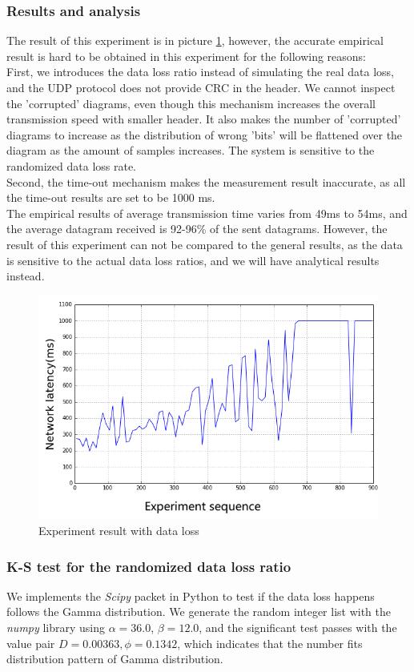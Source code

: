 \documentclass[11pt,openright,a4paper]{report}
\begin{document}
\subsubsection{Results and analysis}
The result of this experiment is in picture \ref{fig:dataLoss}, however, the accurate empirical result is hard to be obtained in this experiment for the following reasons:\\
First, we introduces the data loss ratio instead of simulating the real data loss, and the UDP protocol does not provide CRC in the header. We cannot inspect the 'corrupted' diagrams, even though this mechanism increases the overall transmission speed with smaller header. It also makes the number of 'corrupted' diagrams to increase as the distribution of wrong 'bits' will be flattened over the diagram as the amount of samples increases. The system is sensitive to the randomized data loss rate.\\
Second, the time-out mechanism makes the measurement result inaccurate, as all the time-out results are set to be 1000 ms.\\
The empirical results of average transmission time varies from 49ms to 54ms, and the average datagram received is 92-96\% of the sent datagrams. However, the result of this experiment can not be compared to the general results, as the data is sensitive to the actual data loss ratios, and we will have analytical results instead.\\
\begin{figure}[H]
	\centering
	\includegraphics[width=0.7\linewidth]{picture/experiments/exp1/dataLoss}
	\caption{Experiment result with data loss}
	\label{fig:dataLoss}
\end{figure}
\subsubsection{K-S test for the randomized data loss ratio}
We implements the \textit{Scipy} packet in Python to test if the data loss happens follows the Gamma distribution\cite{scipy}. We generate the random integer list with the \textit{numpy} library using $\alpha=36.0$, $\beta =12.0$, and the significant test passes with the value pair $D=0.00363, \phi = 0.1342$, which indicates that the number fits distribution pattern of Gamma distribution.\\
\end{document}
